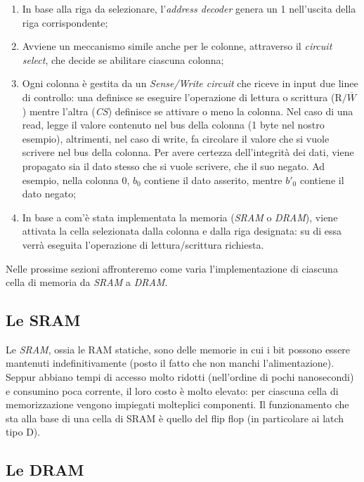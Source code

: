 \documentclass[class=book, crop=false, oneside]{standalone}
\begin{document}
\begin{enumerate}
	\item In base alla riga da selezionare, l'\emph{address decoder} genera un 1 nell'uscita della riga corrispondente;
	\item Avviene un meccanismo simile anche per le colonne, attraverso il \emph{circuit select}, che decide se abilitare ciascuna colonna;
	\item Ogni colonna è gestita da un \emph{Sense/Write circuit} che riceve in input due linee di controllo: una definisce se eseguire l'operazione di lettura o scrittura (\emph{\(\textrm{R/}\overline{W}\)}) mentre l'altra (\emph{CS}) definisce se attivare o meno la colonna. Nel caso di una read, legge il valore contenuto nel bus della colonna (1 byte nel nostro esempio), altrimenti, nel caso di write, fa circolare il valore che si vuole scrivere nel bus della colonna. Per avere certezza dell'integrità dei dati, viene propagato sia il dato stesso che si vuole scrivere, che il suo negato. Ad esempio, nella colonna 0, \(b_0\) contiene il dato asserito, mentre \(b'_0\) contiene il dato negato;
	\item In base a com'è stata implementata la memoria (\emph{SRAM} o \emph{DRAM}), viene attivata la cella selezionata dalla colonna e dalla riga designata: su di essa verrà eseguita l'operazione di lettura/scrittura richiesta.
\end{enumerate}

Nelle prossime sezioni affronteremo come varia l'implementazione di ciascuna cella di memoria da \emph{SRAM} a \emph{DRAM}.

\subsection{Le SRAM}
Le \emph{SRAM}, ossia le RAM statiche, sono delle memorie in cui i bit possono essere mantenuti indefinitivamente (posto il fatto che non manchi l'alimentazione). Seppur abbiano tempi di accesso molto ridotti (nell'ordine di pochi nanosecondi) e consumino poca corrente, il loro costo è molto elevato: per ciascuna cella di memorizzazione vengono impiegati molteplici componenti.
Il funzionamento che sta alla base di una cella di SRAM è quello del flip flop (in particolare ai latch tipo D).

\subsection{Le DRAM}
\end{document}
